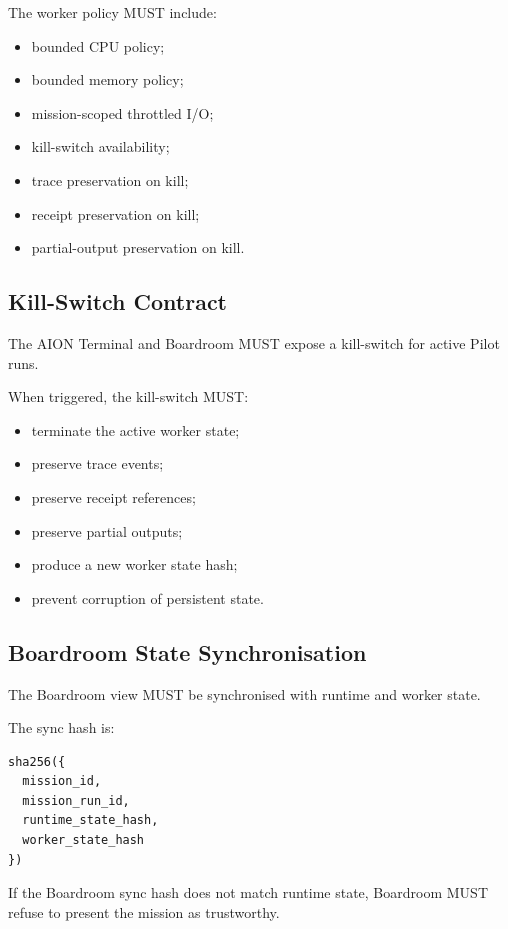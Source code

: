 The worker policy MUST include:

\begin{itemize}
  \item bounded CPU policy;
  \item bounded memory policy;
  \item mission-scoped throttled I/O;
  \item kill-switch availability;
  \item trace preservation on kill;
  \item receipt preservation on kill;
  \item partial-output preservation on kill.
\end{itemize}

\subsection{Kill-Switch Contract}

The AION Terminal and Boardroom MUST expose a kill-switch for active Pilot runs.

When triggered, the kill-switch MUST:

\begin{itemize}
  \item terminate the active worker state;
  \item preserve trace events;
  \item preserve receipt references;
  \item preserve partial outputs;
  \item produce a new worker state hash;
  \item prevent corruption of persistent state.
\end{itemize}

\subsection{Boardroom State Synchronisation}

The Boardroom view MUST be synchronised with runtime and worker state.

The sync hash is:

\begin{verbatim}
sha256({
  mission_id,
  mission_run_id,
  runtime_state_hash,
  worker_state_hash
})
\end{verbatim}

If the Boardroom sync hash does not match runtime state, Boardroom MUST refuse to present the mission as trustworthy.


